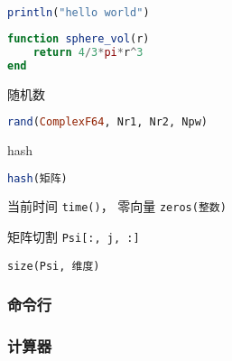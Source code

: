 
\begin{issues}
\issueDraft
\end{issues}

\begin{lstlisting}[language=julia]
println("hello world")
\end{lstlisting}

\begin{lstlisting}[language=julia]
function sphere_vol(r)
    return 4/3*pi*r^3
end
\end{lstlisting}

随机数
\begin{lstlisting}[language=julia]
rand(ComplexF64, Nr1, Nr2, Npw)
\end{lstlisting}

hash
\begin{lstlisting}[language=julia]
hash(矩阵)
\end{lstlisting}

当前时间 \verb|time()|， 零向量 \verb|zeros(整数)|

矩阵切割 \verb|Psi[:, j, :]|

\verb|size(Psi, 维度)|



\subsubsection{命令行}

\subsubsection{计算器}

